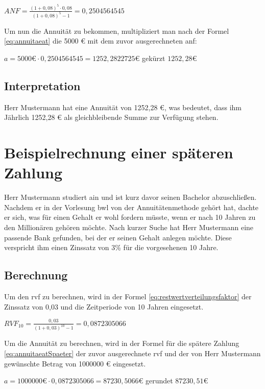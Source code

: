 \bigskip

$ANF = \frac{ (1 + 0,08)^5 \cdot 0,08 }{ (1 + 0,08)^5 - 1 } = 0,2504564545$

\bigskip

\noindent
Um nun die Annuität zu bekommen, multipliziert man nach der Formel \eqref{eq:annuitaeat} die 5000 € mit dem zuvor ausgerechneten \ac{anf}:

\bigskip

$a = 5000 \text{€} \cdot 0,2504564545 = 1252,2822725 \text{€}$ gekürzt $1252,28 \text{€}$

\subsection{Interpretation}

Herr Mustermann hat eine Annuität von 1252,28 €, was bedeutet, dass ihm Jährlich 1252,28 € als gleichbleibende Summe zur Verfügung stehen.


\section{Beispielrechnung einer späteren Zahlung}

Herr Mustermann studiert \ac{ain} und ist kurz davor seinen Bachelor abzuschließen. Nachdem er in der Vorlesung \ac{bwl} von der Annuitätenmethode gehört hat, dachte er sich, was für einen Gehalt er wohl fordern müsste, wenn er nach 10 Jahren zu den Millionären gehören möchte. Nach kurzer Suche hat Herr Mustermann eine passende Bank gefunden, bei der er seinen Gehalt anlegen möchte. Diese verspricht ihm einen Zinssatz von 3\% für die vorgesehenen 10 Jahre.

\subsection{Berechnung}

Um den \ac{rvf} zu berechnen, wird in der Formel \eqref{eq:restwertverteilungsfaktor} der Zinssatz von 0,03 und die Zeitperiode von 10 Jahren eingesetzt.

\bigskip
$RVF_{10} = \frac{ 0,03 }{ (1 + 0,03)^{10} - 1 } = 0,0872305066$

\bigskip
\noindent
Um die Annuität zu berechnen, wird in der Formel für die spätere Zahlung \eqref{eq:annuitaeatSpaeter} der zuvor ausgerechnete \ac{rvf} und der von Herr Mustermann gewünschte Betrag von 1000000 € eingesetzt.

\bigskip
$a = 1000000 \text{€} \cdot 0,0872305066 = 87230,5066 \text{€}$ gerundet $87230,51 \text{€}$

